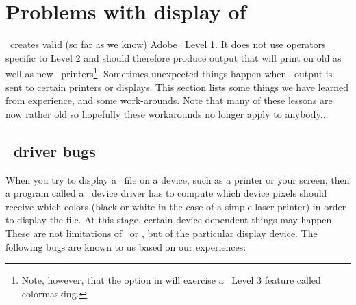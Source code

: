 %
%
\chapter{Problems with display of \gmt\ \PS}
\thispagestyle{headings}

\GMT\ creates valid (so far as we know) Adobe \PS\
Level 1.  It does not use operators specific to Level 2 and
should therefore produce output that will print on old as well
as new \PS\ printers\footnote{Note, however, that the  option in 
will exercise a \PS\ Level 3 feature called colormasking.}.  Sometimes unexpected things
happen when \GMT\ output is sent to certain printers or displays.
This section lists some things we have learned from experience,
and some work-arounds.  Note that many of these lessons are now rather old so hopefully
these workarounds no longer apply to anybody...

\section{\PS\ driver bugs}

When you try to display a \PS\ file on a device,
such as a printer or your screen, then a program called a
\PS\ device driver has to compute which device
pixels should receive which colors (black or white in the case
of a simple laser printer) in order to display the file.  At
this stage, certain device-dependent things may happen.  These
are not limitations of \GMT\ or \PS, but of the
particular display device.  The following bugs are known to us
based on our experiences:

